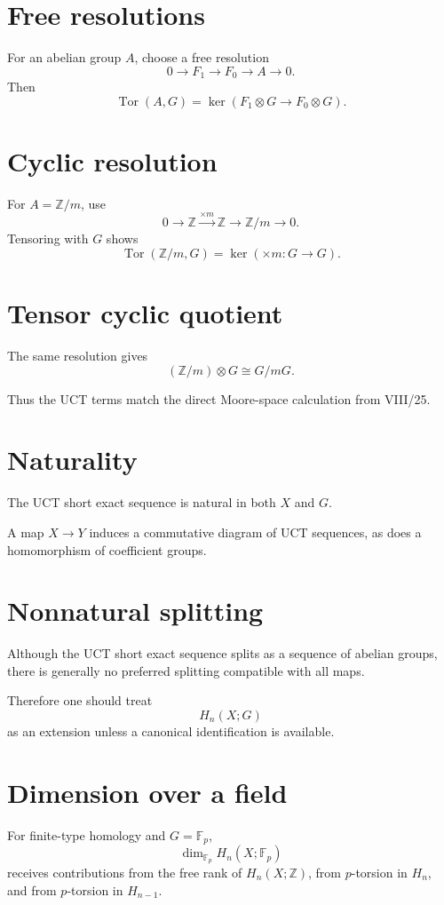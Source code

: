 \section{Free resolutions}
For an abelian group \(A\), choose a free resolution
\[
0\to F_1\to F_0\to A\to0.
\]
Then
\[
\operatorname{Tor}(A,G)
=
\ker(F_1\otimes G\to F_0\otimes G).
\]

\section{Cyclic resolution}
For \(A=\mathbb Z/m\), use
\[
0\to\mathbb Z\xrightarrow{\times m}\mathbb Z\to\mathbb Z/m\to0.
\]
Tensoring with \(G\) shows
\[
\operatorname{Tor}(\mathbb Z/m,G)
=
\ker(\times m:G\to G).
\]

\section{Tensor cyclic quotient}
The same resolution gives
\[
(\mathbb Z/m)\otimes G\cong G/mG.
\]

Thus the UCT terms match the direct Moore-space calculation from VIII/25.

\section{Naturality}
The UCT short exact sequence is natural in both \(X\) and \(G\).

A map \(X\to Y\) induces a commutative diagram of UCT sequences, as does a
homomorphism of coefficient groups.

\section{Nonnatural splitting}
Although the UCT short exact sequence splits as a sequence of abelian groups,
there is generally no preferred splitting compatible with all maps.

Therefore one should treat
\[
H_n(X;G)
\]
as an extension unless a canonical identification is available.

\section{Dimension over a field}
For finite-type homology and \(G=\mathbb F_p\),
\[
\dim_{\mathbb F_p}H_n(X;\mathbb F_p)
\]
receives contributions from the free rank of \(H_n(X;\mathbb Z)\), from
\(p\)-torsion in \(H_n\), and from \(p\)-torsion in \(H_{n-1}\).

